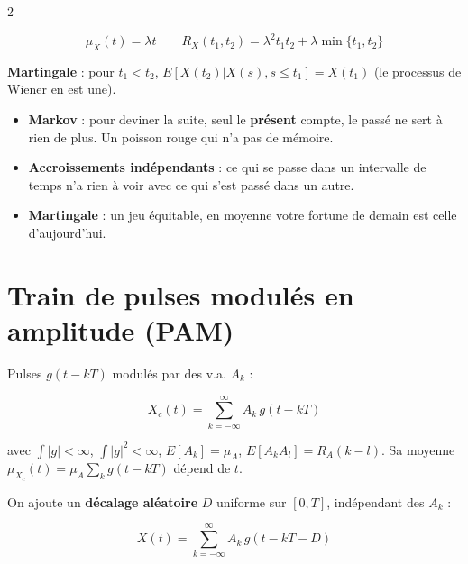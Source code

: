 \documentclass[a4paper,9pt]{extarticle}
\begin{document}
\begin{multicols}{2}
\begin{definition}
\[
\mu_X(t) = \lambda t \qquad R_X(t_1,t_2) = \lambda^2t_1t_2 + \lambda\min\{t_1,t_2\}
\]

\textbf{Martingale} : pour $t_1 < t_2$, $E[X(t_2)|X(s), s\le t_1] = X(t_1)$ (le processus de
Wiener en est une).

\end{definition}


\begin{simple}

\begin{itemize}

\item \textbf{Markov} : pour deviner la suite, seul le \textbf{présent} compte, le passé ne
sert à rien de plus. Un poisson rouge qui n'a pas de mémoire.

\item \textbf{Accroissements indépendants} : ce qui se passe dans un intervalle de temps n'a
rien à voir avec ce qui s'est passé dans un autre.

\item \textbf{Martingale} : un jeu équitable, en moyenne votre fortune de demain est celle
d'aujourd'hui.

\end{itemize}

\end{simple}


\section{Train de pulses modulés en amplitude (PAM)}


\begin{definition}

Pulses $g(t-kT)$ modulés par des v.a. $A_k$ :

\[
X_c(t) = \sum_{k=-\infty}^{\infty}A_k\,g(t-kT)
\]

avec $\int|g| < \infty$, $\int|g|^2 < \infty$, $E[A_k] = \mu_A$, $E[A_kA_l] = R_A(k-l)$. Sa
moyenne $\mu_{X_c}(t) = \mu_A\sum_kg(t-kT)$ dépend de $t$.

\vspace{3pt}

On ajoute un \textbf{décalage aléatoire} $D$ uniforme sur $[0,T]$, indépendant des $A_k$ :

\[
X(t) = \sum_{k=-\infty}^{\infty}A_k\,g(t-kT-D)
\]

\end{definition}



\end{multicols}
\end{document}

